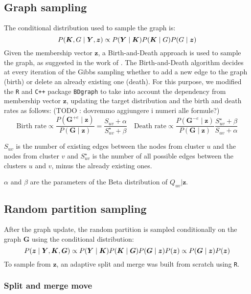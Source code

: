 \subsection{Graph sampling}
The conditional distribution used to sample the graph is:
\[
    \small P(\bm{K},G \mid \bm{Y},\bm{z}) \propto P(\bm{Y} \mid \bm{K})P(\bm{K} \mid {G}) P(G \mid \bm{z})
\]
Given the membership vector $\bm{z}$, a Birth-and-Death approach is used to sample the graph, as suggested in the work of \textcite{mohammadiBayesianStructureLearning2015a}.
The Birth-and-Death algorithm decides at every iteration of the Gibbs sampling whether to add a new edge to the graph (birth) or delete an already existing one (death).
For this purpose, we modified the \texttt{R} and \texttt{C++} package \texttt{BDgraph} to take into account the dependency from membership vector $\bm{z}$, updating the target distribution and the birth and death rates as follows: (TODO : dovremmo aggiungere i numeri alle formule?)
\[
\text{Birth rate} \propto \frac{P(\bm{G}^{+ e}\mid \bm{z})}{P(\bm{G}\mid \bm{z})} = \frac{S_{uv} + \alpha}{S^{\star}_{uv} + \beta}
\quad
\text{Death rate} \propto \frac{P(\bm{G}^{- e}\mid \bm{z})}{P(\bm{G}\mid \bm{z})} \frac{S^{\star}_{uv} + \beta}{S_{uv} + \alpha}
\]

$S_{uv}$ is the number of existing edges between the nodes from cluster $u$ and the nodes from cluster $v$ and $S^{\star}_{uv}$ is the number of all possible edges between the clusters $u$ and $v$, minus the already existing ones. 

$\alpha$ and $\beta$ are the parameters of the Beta distribution of $Q_{uv}\vert \bm{z}$.

\subsection{Random partition sampling}
After the graph update, the random partition is sampled conditionally on the graph $\bm{G}$ using the conditional distribution:
\begin{equation*}
    \small P(\bm{z} \mid \bm{Y},\bm{K},\bm{G}) \propto P(\bm{Y} \mid \bm{K})P(\bm{K} \mid \bm{G})P(\bm{G} \mid \bm{z})P(\bm{z}) \propto P(\bm{G} \mid \bm{z})P(\bm{z})
\end{equation*}
To sample from $\bm{z}$, an adaptive split and merge was built from scratch using \texttt{R}.

\subsubsection{Split and merge move}

